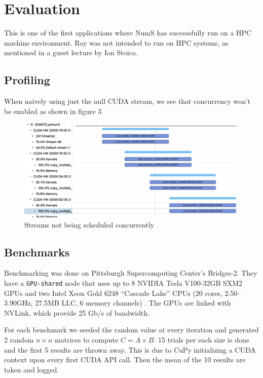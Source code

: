 \documentclass{article}
\begin{document}
\section{Evaluation}
This is one of the first applications where NumS has successfully run on a HPC machine environment. Ray was not intended to run on HPC systems, as mentioned in a guest lecture by Ion Stoica. \cite{ray-lecture}

\subsection{Profiling}
When naively using just the null CUDA stream, we see that concurrency won't be enabled as shown in figure 3

\begin{figure}
  \centerline{\includegraphics[width=6in]{figures/stream.png}}
  \caption{Streams not being scheduled concurrently}
\end{figure}

\subsection{Benchmarks}
Benchmarking was done on Pittsburgh Supercomputing Center's Bridges-2. They have a \verb|GPU-shared| node that uses up to 8 NVIDIA Tesla V100-32GB SXM2 GPUs and two Intel Xeon Gold 6248 “Cascade Lake” CPUs (20 cores, 2.50–3.90GHz, 27.5MB LLC, 6 memory channels) \cite{psc}. The GPUs are linked with NVLink, which provide 25 Gb/s of bandwidth.


For each benchmark we seeded the random value at every iteration and generated 2 random $n \times n$ matrices to compute $C =  A \times B$. 15 trials per each size is done and the first 5 results are thrown away. This is due to CuPy initializing a CUDA context upon every first CUDA API call. Then the mean of the 10 results are taken and logged.
\end{document}
